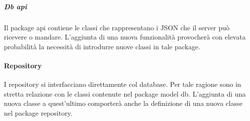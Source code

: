 \documentclass[../../manuale-manutentore.tex]{subfiles}
\begin{document}
\subparagraph{Db api}%
\label{subp:api}

Il package api contiene le classi che rappresentano i JSON che il server può ricevere o mandare.
L'aggiunta di una nuova funzionalità provocherà con elevata probabilità la necessità di introdurre nuove classi in tale package.

\paragraph{Repository}%
\label{par:repository}

I repository si interfacciano direttamente col database.
Per tale ragione sono in stretta relazione con le classi contenute nel package model db.
L'aggiunta di una nuova classe a quest'ultimo comporterà anche la definizione di una nuova classe nel package repository.
\end{document}
